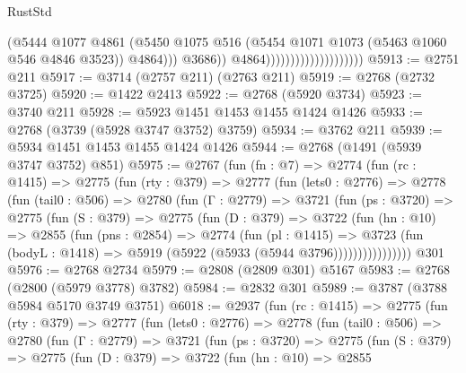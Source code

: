 \begin{lexlean}{RustStd}
\begin{coremodule}
                                                  (@5444
                                                    @1077
                                                    @4861
                                                    (@5450
                                                      @1075
                                                      @516
                                                      (@5454
                                                        @1071
                                                        @1073
                                                        (@5463 @1060 @546 @4846 @3523))
                                                      @4864)))
                                                @3686))
                                            @4864))))))))))))))))))))
@5913 := @2751 @211
@5917 := @3714 (@2757 @211) (@2763 @211)
@5919 := @2768 (@2732 @3725)
@5920 := @1422 @2413
@5922 := @2768 (@5920 @3734)
@5923 := @3740 @211
@5928 := @5923 @1451 @1453 @1455 @1424 @1426
@5933 := @2768 (@3739 (@5928 @3747 @3752) @3759)
@5934 := @3762 @211
@5939 := @5934 @1451 @1453 @1455 @1424 @1426
@5944 := @2768 (@1491 (@5939 @3747 @3752) @851)
@5975 := @2767
    (fun (fn : @7) =>
    @2774
      (fun (rc : @1415) =>
      @2775
        (fun (rty : @379) =>
        @2777
          (fun (lets0 : @2776) =>
          @2778
            (fun (tail0 : @506) =>
            @2780
              (fun (Γ : @2779) =>
              @3721
                (fun (ps : @3720) =>
                @2775
                  (fun (S : @379) =>
                  @2775
                    (fun (D : @379) =>
                    @3722
                      (fun (hn : @10) =>
                      @2855
                        (fun (pns : @2854) =>
                        @2774
                          (fun (pl : @1415) =>
                          @3723
                            (fun (bodyL : @1418) => @5919 (@5922 (@5933 (@5944 @3796))))))))))))))))
    @301
@5976 := @2768 @2734
@5979 := @2808 (@2809 @301) @5167
@5983 := @2768 (@2800 (@5979 @3778) @3782)
@5984 := @2832 @301
@5989 := @3787 (@3788 @5984 @5170 @3749 @3751)
@6018 := @2937
    (fun (rc : @1415) =>
    @2775
      (fun (rty : @379) =>
      @2777
        (fun (lets0 : @2776) =>
        @2778
          (fun (tail0 : @506) =>
          @2780
            (fun (Γ : @2779) =>
            @3721
              (fun (ps : @3720) =>
              @2775
                (fun (S : @379) =>
                @2775
                  (fun (D : @379) =>
                  @3722
                    (fun (hn : @10) =>
                    @2855

\end{coremodule}
\end{lexlean}
